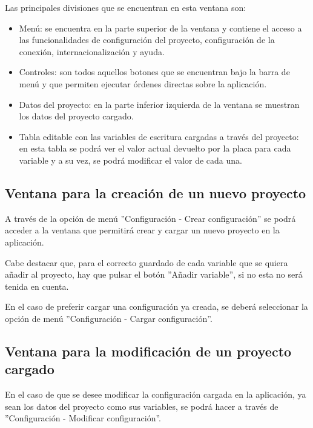 Las principales divisiones que se encuentran en esta ventana son:

\begin{itemize}
	\item Menú: se encuentra en la parte superior de la ventana y contiene el acceso a las funcionalidades de configuración del proyecto, configuración de la conexión, internacionalización y ayuda.
	\item Controles: son todos aquellos botones que se encuentran bajo la barra de menú y que permiten ejecutar órdenes directas sobre la aplicación.
	\item Datos del proyecto: en la parte inferior izquierda de la ventana se muestran los datos del proyecto cargado.
	\item Tabla editable con las variables de escritura cargadas a través del proyecto: en esta tabla se podrá ver el valor actual devuelto por la placa para cada variable y a su vez, se podrá modificar el valor de cada una.
\end{itemize}


\subsection{Ventana para la creación de un nuevo proyecto}

A través de la opción de menú ''Configuración - Crear configuración'' se podrá acceder a la ventana que permitirá crear y cargar un nuevo proyecto en la aplicación.

Cabe destacar que, para el correcto guardado de cada variable que se quiera añadir al proyecto, hay que pulsar el botón ''Añadir variable'', si no esta no será tenida en cuenta.


En el caso de preferir cargar una configuración ya creada, se deberá seleccionar la opción de menú ''Configuración - Cargar configuración''.

\subsection{Ventana para la modificación de un proyecto cargado}

En el caso de que se desee modificar la configuración cargada en la aplicación, ya sean los datos del proyecto como sus variables, se podrá hacer a través de ''Configuración - Modificar configuración''.

